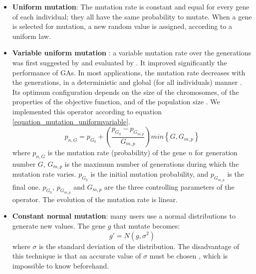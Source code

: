 \documentclass[twocol]{ametsoc}
\begin{document}
\begin{itemize}
	\item \textbf{Uniform mutation}: The mutation rate is constant and equal for every gene of each individual; they all have the same probability to mutate. When a gene is selected for mutation, a new random value is assigned, according to a uniform law.
	
	\item \textbf{Variable uniform mutation} \citep{Fogarty1989}: a variable mutation rate over the generations was first suggested by \citet{Holland1992b} and evaluated by \citet{Fogarty1989}. It improved significantly the performance of GAs. In most applications, the mutation rate decreases with the generations, in a deterministic and global (for all individuals) manner \citep{Back1992b}. Its optimum configuration depends on the size of the chromosomes, of the properties of the objective function, and of the population size \citep{Back1992b}. We implemented this operator according to equation \ref{equation_mutation_uniformvariable}.
	\begin{equation}
	p_{n,G} = p_{G_{0}}+\left( \dfrac{p_{G_{0}}-p_{G_{m,p}}}{G_{m,p}} \right) min\left\lbrace G,G_{m,p}\right\rbrace 
	\label{equation_mutation_uniformvariable}
	\end{equation}
	where $p_{n,G}$ is the mutation rate (probability) of the gene $n$ for generation number $G$, $G_{m,p}$ is the maximum number of generations during which the mutation rate varies. $p_{G_{0}}$ is the initial mutation probability, and $p_{G_{m,p}}$ is the final one. $p_{G_{0}}$, $p_{G_{m,p}}$ and $G_{m,p}$ are the three controlling parameters of the operator. The evolution of the mutation rate is linear.
	
	\item \textbf{Constant normal mutation}: many users use a normal distributions to generate new values. The gene $g$ that mutate becomes:
	\begin{equation}
	g' = N(g,\sigma^{2})
	\label{equation_mutating_normal_distribution}
	\end{equation}
	where $\sigma$ is the standard deviation of the distribution. The disadvantage of this technique is that an accurate value of $\sigma$ must be chosen \citep{Haupt2004}, which is impossible to know beforehand.
	

\end{itemize}
\end{document}
